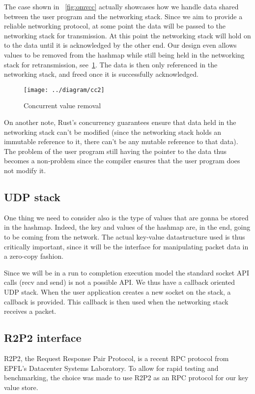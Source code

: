 \documentclass[11pt]{article}
\begin{document}
The case shown in ~\ref{fig:omvcc} actually showcases how we handle
data shared between the user program and the networking stack. Since
we aim to provide a reliable networking protocol, at some point the
data will be passed to the networking stack for transmission. At this
point the networking stack will hold on to the data until it is
acknowledged by the other end. Our design even allows values to be
removed from the hashmap while still being held in the networking
stack for retransmission, see~\ref{fig:cc2}. The data is then only
referenced in the networking stack, and freed once it is successfully
acknowledged.

\begin{figure}[h!]
  \texttt{[image: ../diagram/cc2]}
  \caption{Concurrent value removal}
  \label{fig:cc2}
\end{figure}

On another note, Rust's concurrency guarantees ensure that data held
in the networking stack can't be modified (since the networking stack
holds an immutable reference to it, there can't be any mutable
reference to that data). The problem of the user program still having
the pointer to the data thus becomes a non-problem since the compiler
ensures that the user program does not modify it.

\subsection{UDP stack}

One thing we need to consider also is the type of values that are
gonna be stored in the hashmap. Indeed, the key and values of the
hashmap are, in the end, going to be coming from the network. The
actual key-value datastructure used is thus critically important,
since it will be the interface for manipulating packet data in a
zero-copy fashion.

Since we will be in a run to completion execution model the standard
socket API calls (recv and send) is not a possible API\@. We thus have
a callback oriented UDP stack. When the user application creates a
new socket on the stack, a callback is provided. This callback is then
used when the networking stack receives a packet.

\subsection{R2P2 interface}

R2P2, the Request Response Pair Protocol, is a recent RPC protocol
from EPFL's Datacenter Systems Laboratory. To allow for rapid testing
and benchmarking, the choice was made to use R2P2 as an RPC protocol
for our key value store.
\end{document}
